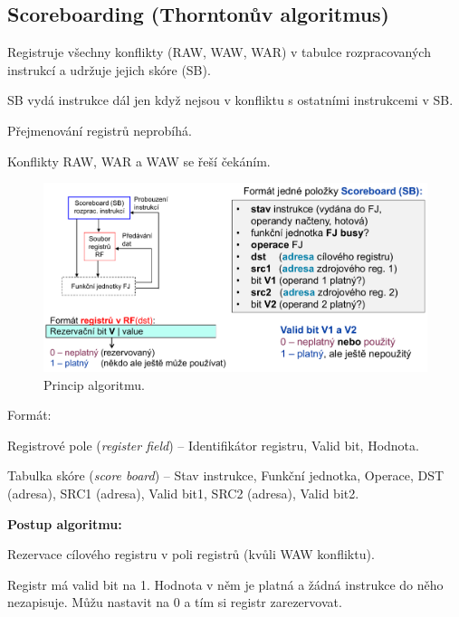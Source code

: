 \subsection{Scoreboarding (Thorntonův algoritmus)}

\begin{compactitem}
    \item Registruje všechny konflikty (RAW, WAW, WAR) v tabulce rozpracovaných instrukcí a udržuje jejich skóre (SB).

    \item SB vydá instrukce dál jen když nejsou v konfliktu s ostatními instrukcemi v SB.

    \item Přejmenování registrů neprobíhá.

    \item Konflikty RAW, WAR a WAW se řeší čekáním.

    \begin{figure}[H]
        \centering
        \includegraphics[width=1\linewidth]{score_board.pdf}
        \caption{Princip algoritmu.}
    \end{figure}

    \item Formát: \begin{compactitem}
        \item Registrové pole (\textit{register field}) -- Identifikátor registru, Valid bit, Hodnota.
        \item Tabulka skóre (\textit{score board}) -- Stav instrukce, Funkční jednotka, Operace, DST (adresa), SRC1 (adresa), Valid bit1, SRC2 (adresa), Valid bit2.
    \end{compactitem}

    \item \textbf{Postup algoritmu:} \begin{compactenum}
        \item Rezervace cílového registru v poli registrů (kvůli WAW konfliktu). \begin{compactenum}
            \item Registr má valid bit na 1. Hodnota v něm je platná a žádná instrukce do něho nezapisuje. Můžu nastavit na 0 a tím si registr zarezervovat.


\end{compactenum}
\end{compactenum}
\end{compactitem}
